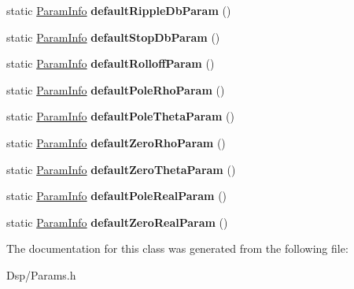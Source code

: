 \begin{DoxyCompactItemize}
\item 
\hypertarget{classDsp_1_1ParamInfo_a6248d83092044674fcc9fa8d1397bf6d}{static \hyperlink{classDsp_1_1ParamInfo}{Param\-Info} {\bfseries default\-Ripple\-Db\-Param} ()}\label{classDsp_1_1ParamInfo_a6248d83092044674fcc9fa8d1397bf6d}

\item 
\hypertarget{classDsp_1_1ParamInfo_af6ad2079480a4f7746dbed670a0450ec}{static \hyperlink{classDsp_1_1ParamInfo}{Param\-Info} {\bfseries default\-Stop\-Db\-Param} ()}\label{classDsp_1_1ParamInfo_af6ad2079480a4f7746dbed670a0450ec}

\item 
\hypertarget{classDsp_1_1ParamInfo_ac69352aaf467c26c984448bbe3df588c}{static \hyperlink{classDsp_1_1ParamInfo}{Param\-Info} {\bfseries default\-Rolloff\-Param} ()}\label{classDsp_1_1ParamInfo_ac69352aaf467c26c984448bbe3df588c}

\item 
\hypertarget{classDsp_1_1ParamInfo_a0e8fb9840b361fdfca599486ba65ecdc}{static \hyperlink{classDsp_1_1ParamInfo}{Param\-Info} {\bfseries default\-Pole\-Rho\-Param} ()}\label{classDsp_1_1ParamInfo_a0e8fb9840b361fdfca599486ba65ecdc}

\item 
\hypertarget{classDsp_1_1ParamInfo_a80c6c04850eb4b3abae9fe7cb6f59a6e}{static \hyperlink{classDsp_1_1ParamInfo}{Param\-Info} {\bfseries default\-Pole\-Theta\-Param} ()}\label{classDsp_1_1ParamInfo_a80c6c04850eb4b3abae9fe7cb6f59a6e}

\item 
\hypertarget{classDsp_1_1ParamInfo_aa2d3cca7cb61162b92b0668d03f7a73f}{static \hyperlink{classDsp_1_1ParamInfo}{Param\-Info} {\bfseries default\-Zero\-Rho\-Param} ()}\label{classDsp_1_1ParamInfo_aa2d3cca7cb61162b92b0668d03f7a73f}

\item 
\hypertarget{classDsp_1_1ParamInfo_a640de3ae4fb65a4f87662a2a8ae41439}{static \hyperlink{classDsp_1_1ParamInfo}{Param\-Info} {\bfseries default\-Zero\-Theta\-Param} ()}\label{classDsp_1_1ParamInfo_a640de3ae4fb65a4f87662a2a8ae41439}

\item 
\hypertarget{classDsp_1_1ParamInfo_a493551d486a78b17d18f881e66d52db4}{static \hyperlink{classDsp_1_1ParamInfo}{Param\-Info} {\bfseries default\-Pole\-Real\-Param} ()}\label{classDsp_1_1ParamInfo_a493551d486a78b17d18f881e66d52db4}

\item 
\hypertarget{classDsp_1_1ParamInfo_a49d0a913099554b4ef4696bf5766b6c6}{static \hyperlink{classDsp_1_1ParamInfo}{Param\-Info} {\bfseries default\-Zero\-Real\-Param} ()}\label{classDsp_1_1ParamInfo_a49d0a913099554b4ef4696bf5766b6c6}

\end{DoxyCompactItemize}


The documentation for this class was generated from the following file\-:\begin{DoxyCompactItemize}
\item 
Dsp/Params.\-h\end{DoxyCompactItemize}
